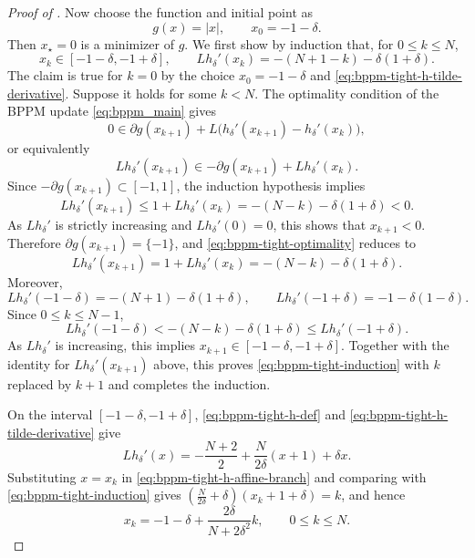 \documentclass[10pt,a4paper]{amsart}
\newcommand{\bregprox}{g}
\begin{document}
\begin{proof}[Proof of ]
Now choose the function and initial point as
\[
    \bregprox(x)=|x|,
    \qquad
    x_0=-1-\delta.
\]
Then $x_\star=0$ is a minimizer of $\bregprox$.
We first show by induction that, for $0\le k\le N$,
\begin{equation}
    x_k\in[-1-\delta,-1+\delta],
    \qquad
    Lh_\delta'(x_k)=-(N+1-k)-\delta(1+\delta).
    \label{eq:bppm-tight-induction}
\end{equation}
The claim is true for $k=0$ by the choice $x_0=-1-\delta$ and \eqref{eq:bppm-tight-h-tilde-derivative}.
Suppose it holds for some $k<N$.
The optimality condition of the BPPM update \eqref{eq:bppm_main} gives
\begin{equation*}
    0\in \partial\bregprox(x_{k+1})
    +L\bigl(h_\delta'(x_{k+1})-h_\delta'(x_k)\bigr),
\end{equation*}
or equivalently
\begin{equation}
    Lh_\delta'(x_{k+1})
    \in
    -\partial\bregprox(x_{k+1})+Lh_\delta'(x_k).
    \label{eq:bppm-tight-optimality}
\end{equation}
Since $-\partial\bregprox(x_{k+1})\subset[-1,1]$, the induction hypothesis implies
\[
    Lh_\delta'(x_{k+1})
    \le
    1+Lh_\delta'(x_k)
    =-(N-k)-\delta(1+\delta)
    <0.
\]
As $Lh_\delta'$ is strictly increasing and $Lh_\delta'(0)=0$, this shows that $x_{k+1}<0$.
Therefore $\partial\bregprox(x_{k+1})=\{-1\}$, and \eqref{eq:bppm-tight-optimality} reduces to
\[
    Lh_\delta'(x_{k+1})
    =
    1+Lh_\delta'(x_k)
    =
    -(N-k)-\delta(1+\delta).
\]
Moreover,
\[
    Lh_\delta'(-1-\delta)=-(N+1)-\delta(1+\delta),
    \qquad
    Lh_\delta'(-1+\delta)=-1-\delta(1-\delta).
\]
Since $0\le k\le N-1$,
\[
    Lh_\delta'(-1-\delta)
    <
    -(N-k)-\delta(1+\delta)
    \le
    Lh_\delta'(-1+\delta).
\]
As $Lh_\delta'$ is increasing, this implies $x_{k+1}\in[-1-\delta,-1+\delta]$.
Together with the identity for $Lh_\delta'(x_{k+1})$ above, this proves \eqref{eq:bppm-tight-induction} with $k$ replaced by $k+1$ and completes the induction.

On the interval $[-1-\delta,-1+\delta]$, \eqref{eq:bppm-tight-h-def} and \eqref{eq:bppm-tight-h-tilde-derivative} give
\begin{equation}
    Lh_\delta'(x)
    =
    -\frac{N+2}{2}+\frac{N}{2\delta}(x+1)+\delta x.
    \label{eq:bppm-tight-h-affine-branch}
\end{equation}
Substituting $x=x_k$ in \eqref{eq:bppm-tight-h-affine-branch} and comparing with \eqref{eq:bppm-tight-induction} gives $\left(\frac{N}{2\delta}+\delta\right)(x_k+1+\delta)=k$, and hence
\begin{equation}
    x_k=-1-\delta+\frac{2\delta}{N+2\delta^2}k,
    \qquad 0\le k\le N.
    \label{eq:bppm-tight-trajectory}
\end{equation}


\end{proof}
\end{document}
